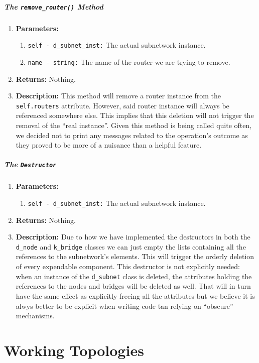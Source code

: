                     \subparagraph{The \texttt{remove\_router()} Method}
                        \begin{enumerate}
                            \item \textbf{Parameters:}
                            \begin{enumerate}
                                \item \texttt{self - d\_subnet\_inst:} The actual subnetwork instance.
                                \item \texttt{name - string:} The name of the router we are trying to remove.
                            \end{enumerate}
                            \item \textbf{Returns:} Nothing.
                            \item \textbf{Description:} This method will remove a router instance from the \texttt{self.routers} attribute. However, said router instance will always be referenced somewhere else. This implies that this deletion will not trigger the removal of the ``real instance''. Given this method is being called quite often, we decided not to print any messages related to the operation's outcome as they proved to be more of a nuisance than a helpful feature.
                        \end{enumerate}

                    \subparagraph{The \texttt{Destructor}}
                        \begin{enumerate}
                            \item \textbf{Parameters:}
                            \begin{enumerate}
                                \item \texttt{self - d\_subnet\_inst:} The actual subnetwork instance.
                            \end{enumerate}
                            \item \textbf{Returns:} Nothing.
                            \item \textbf{Description:} Due to how we have implemented the destructors in both the \texttt{d\_node} and \texttt{k\_bridge} classes we can just empty the lists containing all the references to the subnetwork's elements. This will trigger the orderly deletion of every expendable component. This destructor is not explicitly needed: when an instance of the \texttt{d\_subnet} class is deleted, the attributes holding the references to the nodes and bridges will be deleted as well. That will in turn have the same effect as explicitly freeing all the attributes but we believe it is alwys better to be explicit when writing code tan relying on ``obscure'' mechanisms.
                        \end{enumerate}

    \section{Working Topologies}
